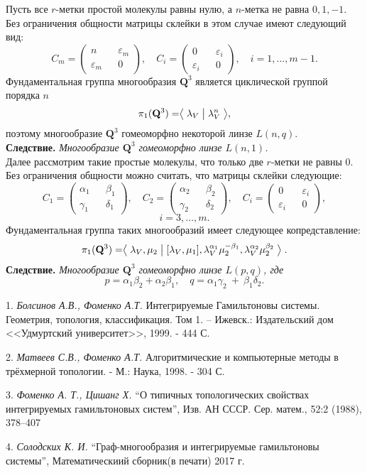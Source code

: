 Пусть все $r$-метки простой молекулы равны нулю, а $n$-метка не равна $0, 1, -1$.
Без ограничения общности матрицы склейки в этом случае имеют следующий вид:
$$
C_m = \begin{pmatrix} n && \varepsilon_m \\ \varepsilon_m && 0 \end{pmatrix}, \quad C_i = \begin{pmatrix} 0 && \varepsilon_i \\ \varepsilon_i && 0 \end{pmatrix},\quad i = 1,\dots, m-1.
$$
Фундаментальная группа многообразия $\mathbf{Q}^3$ является циклической группой порядка $n$
$$
\pi_1(\mathbf{Q}^3) = \bigm\langle \lambda_V \bigm| \lambda_V^n \bigm\rangle,
$$
поэтому многообразие $\mathbf{Q}^3$ гомеоморфно некоторой линзе $L(n, q)$.
\\

\textbf{Следствие.}{ \it
Многообразие $\mathbf{Q}^3$ гомеоморфно линзе $L(n, 1)$.}
\\

Далее рассмотрим такие простые молекулы, что только две $r$-метки не равны 0.
Без ограничения общности можно считать, что матрицы склейки следующие:
$$
C_1 = \begin{pmatrix} \alpha_1 && \beta_1 \\ \gamma_1 && \delta_1 \end{pmatrix}, \quad
C_2 = \begin{pmatrix} \alpha_2 && \beta_2 \\ \gamma_2 && \delta_2 \end{pmatrix},
\quad C_i = \begin{pmatrix} 0 && \varepsilon_i \\ \varepsilon_i && 0 \end{pmatrix},
$$
$$
i = 3,\dots, m.
$$
Фундаментальная группа таких многообразий имеет следующее копредставление:
$$
\pi_1(\mathbf{Q}^3) = \bigm\langle \lambda_V, \mu_2 \bigm|  [\lambda_V, \mu_1],
\lambda^{\alpha_1}_V\mu^{-\beta_1}_2, \lambda^{\alpha_2}_V\mu^{\beta_2}_2 \bigm\rangle.
$$
\textbf{Следствие.} {\it
Многообразие $\mathbf{Q}^3$ гомеоморфно линзе $L(p, q)$, где
}
$$
p = \alpha_1\beta_2 + \alpha_2\beta_1, \quad q = \alpha_1\gamma_2~+~\beta_1\delta_2.
$$

\litlist

1. {\it Болсинов А.В., Фоменко А.Т.}  Интегрируемые Гамильтоновы системы. Геометрия, топология, классификация. Том 1. -- Ижевск.: Издательский дом <<Удмуртский университет>>, 1999. - 444 С.

2. {\it Матвеев С.В., Фоменко А.Т.} Алгоритмические и компьютерные методы в трёхмерной топологии.  - М.: Наука, 1998. - 304 С.

3. {\it Фоменко А. Т., Цишанг Х.} “О типичных топологических свойствах интегрируемых гамильтоновых систем”, Изв. АН СССР. Сер. матем., 52:2 (1988), 378–407

4. {\it Солодских К. И.} “Граф-многообразия и интегрируемые гамильтоновы системы”, Математическиий сборник(в печати) 2017 г.

